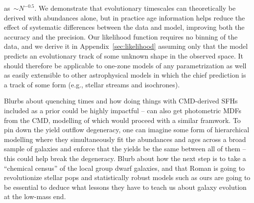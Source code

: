 \documentclass[ms.tex]{subfiles}
\begin{document}
as~$\sim$$N^{-0.5}$.
We demonstrate that evolutionary timescales can theoretically be derived with
abundances alone, but in practice age information helps reduce the effect of
systematic differences between the data and model, improving both the
accuracy and the precision.
Our likelihood function requires no binning of the data, and we derive it
in Appendix~\ref{sec:likelihood} assuming only that the model predicts an
evolutionary track of some unknown shape in the observed space.
It should therefore be applicable to one-zone models of any parametrization as
well as easily extensible to other astrophysical models in which the chief
prediction is a track of some form (e.g., stellar streams and isochrones).
\par
{\color{red}
Blurbs about quenching times and how doing things with CMD-derived SFHs included
as a prior could be highly impactful -- can also get photometric MDFs from the
CMD, modelling of which would proceed with a similar framwork.
To pin down the yield outflow degeneracy, one can imagine some form of
hierarchical modelling where they simultaneously fit the abundances and ages
across a broad sample of galaxies and enforce that the yields be the same
between all of them -- this could help break the degeneracy.
Blurb about how the next step is to take a ``chemical census'' of the local
group dwarf galaxies, and that Roman is going to revolutionize stellar pops
and statistically robust models such as ours are going to be essential to
deduce what lessons they have to teach us about galaxy evolution at the
low-mass end.}
\end{document}

